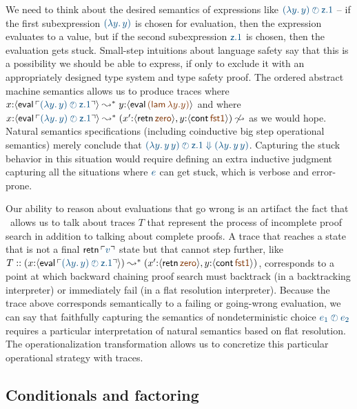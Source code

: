 We need to think about the desired semantics of 
expressions like $\obj{(\lambda y.\,y)
\arb {\sf z}.1}$ -- if the first subexpression $\obj{(\lambda y.\,y)}$ is
chosen for evaluation, then the expression evaluates to a value, but
if the second subexpression $\obj{{\sf z}.1}$ is chosen, then the evaluation
gets stuck. Small-step
intuitions about language safety say that this is a possibility we should
be able to express, if only to exclude it with an appropriately
designed type system and type safety proof. The ordered abstract
machine semantics allows us to produce traces where
%
$x{:}\susp{{\sf eval}\, \interp{(\lambda y.\,y) \arb {\sf z}.1}} \leadsto^* 
 y{:}\susp{{\sf eval}\, \lf{({\sf lam}\,\lambda y.y)}}$
%
and where
%
$x{:}\susp{{\sf eval}\,\interp{(\lambda y.\,y) \arb {\sf z}.1}} \leadsto^* 
 (x'{:}\susp{{\sf retn}\,\lf{\sf zero}}, y{:}\susp{{\sf cont}\,\lf{\sf fst1}})
 \not\leadsto$
%
as we would hope. Natural semantics specifications (including
coinductive big step operational semantics) merely conclude
that $\obj{(\lambda y.\,y\,y) \arb {\sf z}.1 \Downarrow (\lambda
y.\,y\,y)}$. Capturing the stuck behavior in this situation 
would require defining an extra inductive judgment capturing 
all the situations where $\obj{e}$ can get stuck, which is 
verbose and error-prone.

Our ability to reason about evaluations that go wrong is an
artifact the fact that \sls~allows us to talk about traces $T$ 
that represent the process of incomplete proof search 
in addition to talking about complete proofs. 
A trace that reaches a state that is not a final ${\sf retn}\,\interp{v}$
state but that cannot step further, like 
$T :: (x{:}\susp{{\sf eval}\,\interp{(\lambda y.\,y) \arb {\sf z}.1}})
 \leadsto^* 
 (x'{:}\susp{{\sf retn}\,\lf{\sf zero}}, y{:}\susp{{\sf cont}\,\lf{\sf fst1}})$,
corresponds to a point at which backward chaining proof search
must backtrack (in a backtracking interpreter) or immediately 
fail (in a flat resolution interpreter). Because the trace above corresponds
semantically to a failing or going-wrong evaluation, 
we can say that faithfully capturing the semantics of nondeterministic
choice $\obj{e_1 \arb e_2}$ requires a particular interpretation of
natural semantics based on flat resolution. The operationalization
transformation allows us to concretize this particular operational strategy
with traces.

\subsection{Conditionals and factoring}
\label{sec:choicecase}

